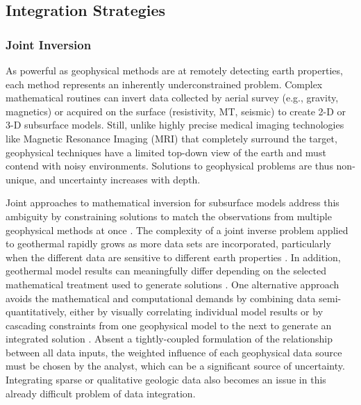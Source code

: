 \subsection{Integration Strategies}\label{ch2:integration_strategies}
\subsubsection{Joint Inversion}\label{ch2:joint_invert}
As powerful as geophysical methods are at remotely detecting earth properties, each method represents an inherently underconstrained problem. Complex mathematical routines can invert data collected by aerial survey (e.g., gravity, magnetics) or acquired on the surface (resistivity, MT, seismic) to create 2-D or 3-D subsurface models. Still, unlike highly precise medical imaging technologies like Magnetic Resonance Imaging (MRI) that completely surround the target, geophysical techniques have a limited top-down view of the earth and must contend with noisy environments. Solutions to geophysical problems are thus non-unique, and uncertainty increases with depth.

Joint approaches to mathematical inversion for subsurface models address this ambiguity by constraining solutions to match the observations from multiple geophysical methods at once \citep{vozoff_joint_1975}. The complexity of a joint inverse problem applied to geothermal rapidly grows as more data sets are incorporated, particularly when the different data are sensitive to different earth properties \citep{moorkamp_framework_2011}. In addition, geothermal model results can meaningfully differ depending on the selected mathematical treatment used to generate solutions \citep{rosenkjaer_comparison_2015}. One alternative approach avoids the mathematical and computational demands by combining data semi-quantitatively, either by visually correlating individual model results or by cascading constraints from one geophysical model to the next to generate an integrated solution \citep{jousset_hengill_2011, lichoro_joint_2019}. Absent a tightly-coupled formulation of the relationship between all data inputs, the weighted influence of each geophysical data source must be chosen by the analyst, which can be a significant source of uncertainty. Integrating sparse or qualitative geologic data also becomes an issue in this already difficult problem of data integration.

